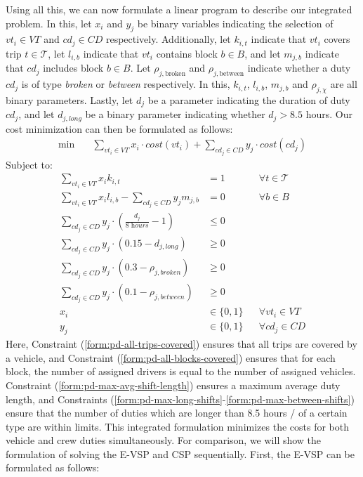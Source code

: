 \documentclass[]{article}
\begin{document}
\noindent Using all this, we can now formulate a linear program to describe our integrated problem. In this, let $x_i$ and $y_j$ be binary variables indicating the selection of $vt_i \in VT$ and $cd_j \in CD$ respectively. Additionally, let $k_{i,t}$ indicate that $vt_i$ covers trip $t \in \mathcal{T}$, let $l_{i,b}$ indicate that $vt_i$ contains block $b \in B$, and let $m_{j,b} $ indicate that $cd_j$ includes block $b \in B$. Let $\rho_{j,\text{broken}}$ and $\rho_{j,\text{between}}$ indicate whether a duty $cd_j$ is of type \textit{broken} or \textit{between} respectively. In this, $k_{i,t}$, $l_{i,b}$, $m_{j,b}$ and $\rho_{j,\chi}$  are all binary parameters. Lastly, let $d_j$ be a parameter indicating the duration of duty $cd_j$, and let $d_{j,\textit{long}}$ be a binary parameter indicating whether $d_j > 8.5$ hours. Our cost minimization can then be formulated as follows:
\begin{align}
\min \quad
& \sum_{vt_i \in VT} x_{i} \cdot cost(vt_i) + \sum_{cd_j \in CD} y_{j} \cdot cost(cd_j)  
\end{align}
Subject to:
\begin{align}
\sum_{vt_i \in VT} x_{i}k_{i,t} &= 1 && \forall t \in \mathcal{T} \label{form:pd-all-trips-covered} \\
\sum_{vt_i \in VT}x_i l_{i,b} - \sum_{cd_j \in CD}y_j m_{j,b} &= 0 && \forall b \in B \label{form:pd-all-blocks-covered} \\
\sum_{cd_j \in \textit{CD}} y_{j} \cdot (\frac{d_{j}}{\textit{8 hours}} - 1) &\leq 0 && \label{form:pd-max-avg-shift-length}\\
\sum_{cd_j \in \textit{CD}} y_{j} \cdot (0.15 - d_{j,\textit{long}}) &\geq 0 && \label{form:pd-max-long-shifts}\\
\sum_{cd_j \in \textit{CD}} y_{j} \cdot (0.3 - \rho_{j,\textit{broken}}) &\geq 0 && \label{form:pd-max-broken-shifts}\\
\sum_{cd_j \in \textit{CD}} y_{j} \cdot (0.1 - \rho_{j,\textit{between}}) &\geq 0 && \label{form:pd-max-between-shifts}\\
x_{i} &\in \{ 0, 1 \} && \forall vt_i \in VT \\
y_{j} &\in \{ 0, 1 \} && \forall cd_j \in CD
\end{align}
Here, Constraint (\ref{form:pd-all-trips-covered}) ensures that all trips are covered by a vehicle, and Constraint (\ref{form:pd-all-blocks-covered}) ensures that for each block, the number of assigned drivers is equal to the number of assigned vehicles. Constraint (\ref{form:pd-max-avg-shift-length}) ensures a maximum average duty length, and Constraints (\ref{form:pd-max-long-shifts}-\ref{form:pd-max-between-shifts}) ensure that the number of duties which are longer than 8.5 hours / of a certain type are within limits. This integrated formulation minimizes the costs for both vehicle and crew duties simultaneously. For comparison, we will show the formulation of solving the E-VSP and CSP sequentially. First, the E-VSP can be formulated as follows:
\end{document}
